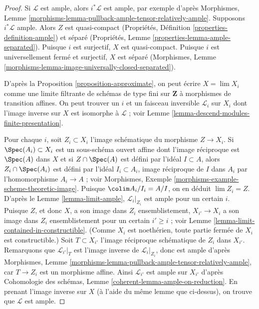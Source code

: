 \begin{proof}
Si $\mathcal{L}$ est ample, alors $i^*\mathcal{L}$ est ample, par
exemple d'après Morphismes, Lemme
\ref{morphisms-lemma-pullback-ample-tensor-relatively-ample}.
Supposons $i^*\mathcal{L}$ ample. Alors $Z$ est quasi-compact
(Propriétés, Définition \ref{properties-definition-ample})
et séparé
(Propriétés, Lemme \ref{properties-lemma-ample-separated}).
Puisque $i$ est surjectif, $X$ est quasi-compact.
Puisque $i$ est universellement fermé et surjectif,
$X$ est séparé (Morphismes, Lemme
\ref{morphisms-lemma-image-universally-closed-separated}).

\medskip\noindent
D'après la Proposition \ref{proposition-approximate}, on peut écrire
$X = \lim X_i$ comme une limite filtrante de schémas de type fini sur $\mathbf{Z}$
à morphismes de transition affines. On peut trouver un $i$ et un faisceau
inversible $\mathcal{L}_i$ sur $X_i$ dont l'image inverse sur $X$ est isomorphe à
$\mathcal{L}$ ; voir Lemme \ref{lemma-descend-modules-finite-presentation}.

\medskip\noindent
Pour chaque $i$, soit $Z_i \subset X_i$ l'image schématique
du morphisme $Z \to X_i$. Si $\Spec(A_i) \subset X_i$ est un sous-schéma ouvert
affine dont l'image réciproque est $\Spec(A)$ dans $X$ et si
$Z \cap \Spec(A)$ est défini par l'idéal $I \subset A$,
alors $Z_i \cap \Spec(A_i)$ est défini par l'idéal $I_i \subset A_i$,
image réciproque de $I$ dans $A_i$ par l'homomorphisme
$A_i \to A$ ; voir
Morphismes, Exemple \ref{morphisms-example-scheme-theoretic-image}.
Puisque $\colim A_i/I_i = A/I$, on en déduit $\lim Z_i = Z$.
D'après le Lemme \ref{lemma-limit-ample}, $\mathcal{L}_i|_{Z_i}$
est ample pour un certain $i$. Puisque $Z$, et donc $X$, a son image dans $Z_i$
ensemblistement, $X_{i'} \to X_i$ a son image dans $Z_i$
ensemblistement pour un certain $i' \geq i$ ; voir
Lemme \ref{lemma-limit-contained-in-constructible}.
(Comme $X_i$ est noethérien, toute partie fermée
de $X_i$ est constructible.) Soit $T \subset X_{i'}$
l'image réciproque schématique de $Z_i$ dans $X_{i'}$.
Remarquons que $\mathcal{L}_{i'}|_T$ est l'image inverse
de $\mathcal{L}_i|_{Z_i}$, donc est ample d'après
Morphismes, Lemme \ref{morphisms-lemma-pullback-ample-tensor-relatively-ample},
car $T \to Z_i$ est un morphisme affine.
Ainsi $\mathcal{L}_{i'}$ est ample sur $X_{i'}$
d'après Cohomologie des schémas, Lemme \ref{coherent-lemma-ample-on-reduction}.
En prenant l'image inverse sur $X$ (à l'aide du même lemme que ci-dessus),
on trouve que $\mathcal{L}$ est ample.
\end{proof}

